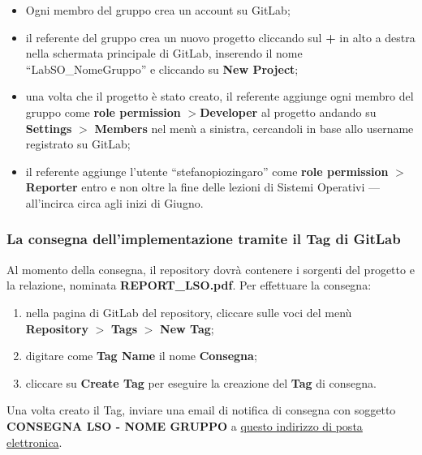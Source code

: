 \begin{tcolorbox}[colback=blue!20!white,colframe=blue!75!black,title=GitLab]
 \begin{itemize}
  \item Ogni membro del gruppo crea un account su GitLab;
  \item il referente del gruppo  crea un nuovo progetto cliccando sul \textbf{+} in alto a destra nella schermata principale di GitLab, inserendo il nome ``LabSO\_NomeGruppo'' e cliccando su \textbf{New Project};
  \item una volta che il progetto è stato creato, il referente aggiunge ogni membro del gruppo come \textbf{role permission} $>$\textbf{Developer} al progetto andando su \textbf{Settings} $>$ \textbf{Members} nel menù a sinistra, cercandoli in base allo username registrato su GitLab;
  \item il referente aggiunge l'utente ``stefanopiozingaro'' come \textbf{role permission} $>$ \textbf{Reporter} entro e non oltre la fine delle lezioni di Sistemi Operativi --- all'incirca circa agli inizi di Giugno.
 \end{itemize}
\end{tcolorbox}

\subsubsection{La consegna dell'implementazione tramite il Tag di GitLab}

Al momento della consegna, il repository dovrà contenere i sorgenti del progetto
e la relazione, nominata \textbf{REPORT\_LSO.pdf}. Per effettuare la consegna:

\begin{enumerate}

 \item nella pagina di GitLab del repository, cliccare sulle voci del menù
       \textbf{Repository} $>$ \textbf{Tags} $>$ \textbf{New Tag};

 \item digitare come \textbf{Tag Name} il nome \textbf{Consegna};

 \item cliccare su \textbf{Create Tag} per eseguire la creazione del
       \textbf{Tag} di consegna.

\end{enumerate}

Una volta creato il Tag, inviare una email di notifica di consegna con soggetto
\textbf{CONSEGNA LSO - NOME GRUPPO} a
\href{mailto:stefanopio.zingaro@unibo.it}{questo indirizzo di posta
 elettronica}.

